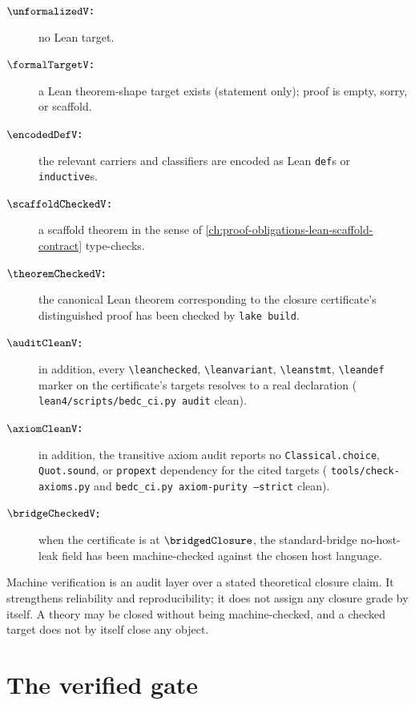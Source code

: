 \begin{definition}
\label{def:formal-status-interpretations}
\begin{description}
  \item[\textbf{$\unformalizedV$:}] no Lean target.
  \item[\textbf{$\formalTargetV$:}] a Lean theorem-shape target exists (statement only); proof is empty, sorry, or scaffold.
  \item[\textbf{$\encodedDefV$:}] the relevant carriers and classifiers are encoded as Lean \texttt{def}s or \texttt{inductive}s.
  \item[\textbf{$\scaffoldCheckedV$:}] a scaffold theorem in the sense of \autoref{ch:proof-obligations-lean-scaffold-contract} type-checks.
  \item[\textbf{$\theoremCheckedV$:}] the canonical Lean theorem corresponding to the closure certificate's distinguished proof has been checked by \texttt{lake build}.
  \item[\textbf{$\auditCleanV$:}] in addition, every \texttt{\textbackslash leanchecked}, \texttt{\textbackslash leanvariant}, \texttt{\textbackslash leanstmt}, \texttt{\textbackslash leandef} marker on the certificate's targets resolves to a real declaration ( \texttt{lean4/scripts/bedc\_ci.py audit} clean).
  \item[\textbf{$\axiomCleanV$:}] in addition, the transitive axiom audit reports no \texttt{Classical.choice}, \texttt{Quot.sound}, or \texttt{propext} dependency for the cited targets ( \texttt{tools/check-axioms.py} and \texttt{bedc\_ci.py axiom-purity --strict} clean).
  \item[\textbf{$\bridgeCheckedV$:}] when the certificate is at $\bridgedClosure$, the standard-bridge no-host-leak field has been machine-checked against the chosen host language.
\end{description}
\end{definition}

\begin{principle}
\label{prin:verification-not-formation}
Machine verification is an audit layer over a stated theoretical closure claim. It strengthens reliability and reproducibility; it does not assign any closure grade by itself. A theory may be closed without being machine-checked, and a checked target does not by itself close any object.
\end{principle}

\section{The verified gate}
\label{sec:verified-gate}

